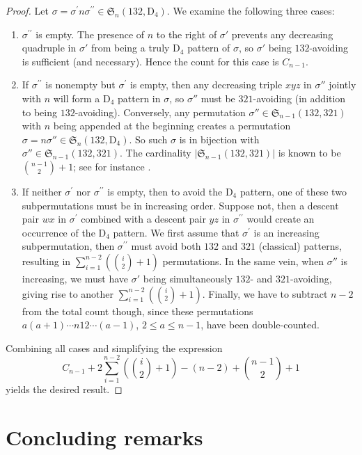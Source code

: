 \documentclass[12pt,reqno]{article}
\numberwithin{equation}{section}
\theoremstyle{plain}
\theoremstyle{definition}
\def\fS{\mathfrak{S}}
\def\rD{\mathrm{D}}
\begin{document}
\begin{proof}
Let $\sigma=\sigma^{\prime}n\sigma^{\prime \prime} \in \fS_{n}(132,\rD_4)$. We examine the following three cases:
	 \begin{enumerate}
	 	\item $\sigma^{\prime \prime}$ is empty. The presence of $n$ to the right of $\sigma'$ prevents any decreasing quadruple in $\sigma'$ from being a truly $\rD_4$ pattern of $\sigma$, so $\sigma'$ being $132$-avoiding is sufficient (and necessary). Hence the count for this case is $C_{n-1}$.
	 	\item If $\sigma^{\prime \prime}$ is nonempty but $\sigma^{\prime}$ is empty, then any decreasing triple $xyz$ in $\sigma''$ jointly with $n$ will form a $\rD_4$ pattern in $\sigma$, so $\sigma''$ must be $321$-avoiding (in addition to being $132$-avoiding). Conversely, any permutation $\sigma''\in\fS_{n-1}(132,321)$ with $n$ being appended at the beginning creates a permutation $\sigma=n\sigma''\in\fS_n(132,\rD_4)$. So such $\sigma$ is in bijection with $\sigma''\in\fS_{n-1}(132,321)$. The cardinality $|\fS_{n-1}\left(132,321\right)|$ is known to be $\binom{n-1}{2}+1$; see for instance \cite[Prop.~11]{SS85}. 
	 	\item If neither $\sigma^{\prime}$ nor $\sigma^{\prime \prime}$ is empty, then to avoid the $\rD_4$ pattern, one of these two subpermutations must be in increasing order. Suppose not, then a descent pair $wx$ in $\sigma^{\prime}$ combined with a descent pair $yz$ in $\sigma^{\prime \prime}$ would create an occurrence of the $\rD_4$ pattern. We first assume that $\sigma^{\prime}$ is an increasing subpermutation, then $\sigma^{\prime \prime}$ must avoid both $132$ and $321$ (classical) patterns, resulting in $\sum_{i=1}^{n-2}(\binom{i}{2} + 1)$ permutations. In the same vein, when $\sigma''$ is increasing, we must have $\sigma'$ being simultaneously $132$- and $321$-avoiding, giving rise to another $\sum_{i=1}^{n-2}(\binom{i}{2} + 1)$. Finally, we have to subtract $n-2$ from the total count though, since these permutations $a(a+1)\cdots n12\cdots (a-1)$, $2\le a\le n-1$, have been double-counted.
	 	\end{enumerate}

Combining all cases and simplifying the expression 
	$$C_{n-1} + 2\sum_{i=1}^{n-2}\left(\binom{i}{2} + 1\right) - (n-2) + \binom{n-1}{2} + 1$$ 
yields the desired result. 
\end{proof}




\section{Concluding remarks}\label{sec:concluding_remarks}
\end{document}

